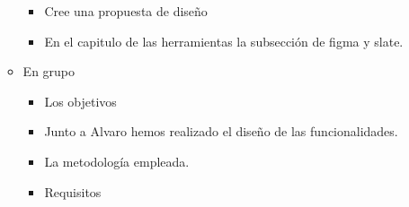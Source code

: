 \begin{itemize}
\begin{itemize}
\begin{itemize}
                        \item Cree una propuesta de diseño
                        \item En el capitulo de las herramientas la subsección de figma y slate.
                    \end{itemize}
              \item En grupo
                    \begin{itemize}
                        \item Los objetivos
                        \item Junto a Alvaro hemos realizado el diseño de las funcionalidades.
                        \item La metodología empleada.
                        \item Requisitos
                    \end{itemize}
          \end{itemize}
\end{itemize}